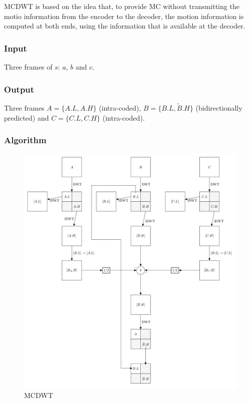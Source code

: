 MCDWT is based on the idea that, to provide MC without transmitting the
motio information from the encoder to the decoder, the motion
information is computed at both ends, using the information that is
available at the decoder.

\hypertarget{input}{%
\subsubsection{Input}\label{input}}

Three frames of \(s\): \(a\), \(b\) and \(c\).

\hypertarget{output}{%
\subsubsection{Output}\label{output}}

Three frames \(A=\{A.L, A.H\}\) (intra-coded),
\(B=\{B.L, \tilde{B}.H\}\) (bidirectionally predicted) and
\(C=\{C.L, C.H\}\) (intra-coded).

\hypertarget{algorithm}{%
\subsubsection{Algorithm}\label{algorithm}}

\begin{figure}
\centering
\includegraphics{forward.png}
\caption{MCDWT}
\end{figure}

